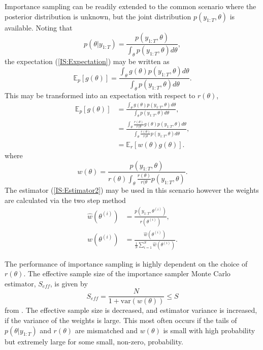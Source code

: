 \documentclass[
12pt, %
onehalfspacing, %
nohyperref, %
headsepline, %
chapterinoneline, %
]{MastersDoctoralThesis} %
\begin{document}
Importance sampling can be readily extended to the common scenario where the posterior distribution is unknown, but the joint distribution $p(y_{1:T}, \theta)$ is available. Noting that 
\begin{equation}
\label{IS:posterior}
p(\theta | y_{1:T}) = \frac{p(y_{1:T}, \theta)}{\int_{\theta} p(y_{1:T}, \theta) d\theta},
\end{equation}
the expectation (\ref{IS:Expectation}) may be written as 
\begin{equation}
\label{IS:Expectation3}
\mathbb{E}_{p} [g(\theta)] = \frac{\int_{\theta} g(\theta) p(y_{1:T}, \theta) d\theta}{\int_{\theta} p(y_{1:T}, \theta) d\theta}.
\end{equation}
This may be transformed into an expectation with respect to $r(\theta)$,
\begin{align}
\mathbb{E}_{p} [g(\theta)] &= \frac{\int_{\theta} g(\theta) p(y_{1:T}, \theta) d\theta}{\int_{\theta} p(y_{1:T}, \theta) d\theta}, \nonumber \\
&= \frac{\int_{\theta} \frac{r(\theta)}{r(\theta} g(\theta) p(y_{1:T}, \theta) d\theta}{\int_{\theta} \frac{r(\theta)}{r(\theta} p(y_{1:T}, \theta) d\theta}, \nonumber \\
&= \mathbb{E}_{r} \left[ w(\theta)g(\theta) \right]. \label{IS:Expectation4}
\end{align}
where 
\begin{equation}
w(\theta) =  \frac{p(y_{1:T}, \theta)}{r(\theta) \int_{\theta} \frac{r(\theta)}{r(\theta} p(y_{1:T}, \theta)}.
\end{equation}
The estimator (\ref{IS:Estimator2}) may be used in this scenario however the weights are calculated via the two step method
\begin{align}
\hat{w}(\theta^{(i)}) &=  \frac{p(y_{1:T}, \theta^{(i)})}{r(\theta^{(i)})}, \\
w(\theta^{(i)}) &= \frac{\hat{w}(\theta^{(i)})}{\frac{1}{S} \sum_{i=1}^S \hat{w}(\theta^{(i)})}.
\end{align}

The performance of importance sampling is highly dependent on the choice of $r(\theta)$. The effective sample size of the importance sampler Monte Carlo estimator, $S_{eff}$, is given by
\begin{equation}
S_{eff} = \frac{N}{1 + \mbox{var}(w(\theta))} \leq S
\end{equation}
from \cite{Kong1994}. The effective sample size is decreased, and estimator variance is increased, if the variance of the weights is large. This most often occurs if the tails of $p(\theta | y_{1:T})$ and $r(\theta)$ are mismatched \citep{Gelman2014} and $w(\theta)$ is small with high probability but extremely large for some small, non-zero, probability. 
\\
\end{document}

